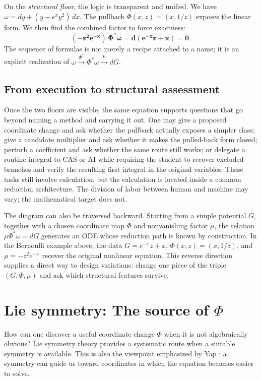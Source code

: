 \documentclass[11pt]{article}
\theoremstyle{definition}
\begin{document}
On the \emph{structural floor}, the logic is transparent and unified. We have \(\omega=dy+(y-e^{x}y^2)\,dx\). 
The pullback \(\Phi(x,z)=(x,1/z)\) exposes the linear form. We then find the combined factor to force exactness:
\[
\boldsymbol{(-z^2e^{-x})\,\Phi^*\omega=d(e^{-x}z+x)=0.}
\]
The sequence of formulas is not merely a recipe attached to a name; it is an explicit realization of \(\omega \xrightarrow{\Phi^*} \Phi^*\omega \xrightarrow{\mu} dG\). 

\subsection*{From execution to structural assessment}
Once the two floors are visible, the same equation supports questions that go beyond naming a method and carrying it out. One may give a proposed coordinate change and ask whether the pullback actually exposes a simpler class; give a candidate multiplier and ask whether it makes the pulled-back form closed; perturb a coefficient and ask whether the same route still works; or delegate a routine integral to CAS or AI while requiring the student to recover excluded branches and verify the resulting first integral in the original variables. These tasks still involve calculation, but the calculation is located inside a common reduction architecture. The division of labor between human and machine may vary; the mathematical target does not.

The diagram can also be traversed backward. Starting from a simple potential \(G\), together with a chosen coordinate map \(\Phi\) and nonvanishing factor \(\mu\), the relation \(\mu\Phi^*\omega=dG\) generates an ODE whose reduction path is known by construction. In the Bernoulli example above, the data \(G=e^{-x}z+x\), \(\Phi(x,z)=(x,1/z)\), and \(\mu=-z^2e^{-x}\) recover the original nonlinear equation. This reverse direction supplies a direct way to design variations: change one piece of the triple \((G,\Phi,\mu)\) and ask which structural features survive.

\section{Lie symmetry: The source of \texorpdfstring{\(\Phi\)}{Phi}}

How can one discover a useful coordinate change \(\Phi\) when it is not algebraically obvious? Lie symmetry theory provides a systematic route when a suitable symmetry is available. This is also the viewpoint emphasized by Yap \cite{Yap2010}: a symmetry can guide us toward coordinates in which the equation becomes easier to solve.
\end{document}

